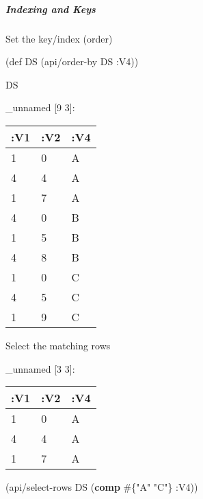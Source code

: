 \documentclass[]{article}
\newenvironment{Shaded}{\begin{snugshade}}{\end{snugshade}}
\newcommand{\AttributeTok}[1]{\textcolor[rgb]{0.77,0.63,0.00}{#1}}
\newcommand{\BuiltInTok}[1]{#1}
\newcommand{\FunctionTok}[1]{\textcolor[rgb]{0.00,0.00,0.00}{#1}}
\newcommand{\KeywordTok}[1]{\textcolor[rgb]{0.13,0.29,0.53}{\textbf{#1}}}
\newcommand{\NormalTok}[1]{#1}
\newcommand{\StringTok}[1]{\textcolor[rgb]{0.31,0.60,0.02}{#1}}
\newcommand{\VariableTok}[1]{\textcolor[rgb]{0.00,0.00,0.00}{#1}}
\let\oldsubparagraph\subparagraph
\renewcommand{\subparagraph}[1]{\oldsubparagraph{#1}\mbox{}}
\begin{document}
\hypertarget{indexing-and-keys}{%
\subparagraph{Indexing and Keys}\label{indexing-and-keys}}

Set the key/index (order)

\begin{Shaded}
\begin{Highlighting}[]
\NormalTok{(}\BuiltInTok{def}\FunctionTok{ DS }\NormalTok{(api/order-by DS }\AttributeTok{:V4}\NormalTok{))}
\end{Highlighting}
\end{Shaded}

\begin{Shaded}
\begin{Highlighting}[]
\NormalTok{DS}
\end{Highlighting}
\end{Shaded}

\_unnamed {[}9 3{]}:

\begin{longtable}[]{@{}lll@{}}
\toprule
:V1 & :V2 & :V4\tabularnewline
\midrule
\endhead
1 & 0 & A\tabularnewline
4 & 4 & A\tabularnewline
1 & 7 & A\tabularnewline
4 & 0 & B\tabularnewline
1 & 5 & B\tabularnewline
4 & 8 & B\tabularnewline
1 & 0 & C\tabularnewline
4 & 5 & C\tabularnewline
1 & 9 & C\tabularnewline
\bottomrule
\end{longtable}

Select the matching rows

\begin{Shaded}
\end{Shaded}

\_unnamed {[}3 3{]}:

\begin{longtable}[]{@{}lll@{}}
\toprule
:V1 & :V2 & :V4\tabularnewline
\midrule
\endhead
1 & 0 & A\tabularnewline
4 & 4 & A\tabularnewline
1 & 7 & A\tabularnewline
\bottomrule
\end{longtable}

\begin{Shaded}
\begin{Highlighting}[]
\NormalTok{(api/select-rows DS (}\KeywordTok{comp}\NormalTok{ #\{}\StringTok{"A"} \StringTok{"C"}\NormalTok{\} }\AttributeTok{:V4}\NormalTok{))}
\end{Highlighting}
\end{Shaded}
\end{document}
